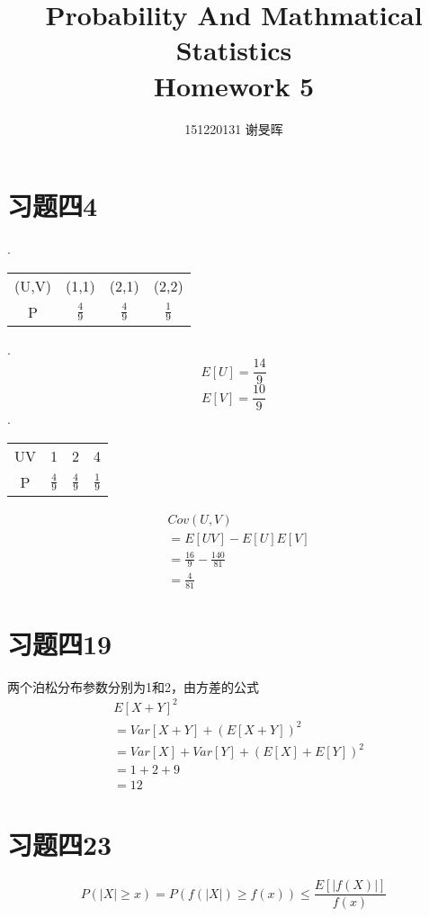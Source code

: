\documentclass[a4paper,twocolumn]{ctexart}
\title{Probability And Mathmatical Statistics\\Homework 5}
\author{151220131 谢旻晖}
\date{}
\begin{document}
\maketitle

\section*{习题四4}
.\\
\begin{center}
\begin{tabular}{cccc}
	\hline
	\hline
	(U,V)&(1,1)&(2,1)&(2,2)\\
	P&$\frac49$&$\frac49$&$\frac19$\\
	\hline
\end{tabular}
\end{center}
.\\
\[
E[U]=\frac{14}{9}
\]
\[
E[V]=\frac{10}{9}
\]
.\\
\begin{center}
	\begin{tabular}{cccc}
		\hline
		\hline
		UV&1&2&4\\
		P&$\frac{4}{9}$&$\frac{4}{9}$&$\frac{1}{9}$\\
		\hline
	\end{tabular}
\end{center}
\begin{align*}
&Cov(U,V)\\
&=E[UV]-E[U]E[V]\\
&=\frac{16}{9}-\frac{140}{81}\\
&=\frac{4}{81}
\end{align*}
\section*{习题四19}
两个泊松分布参数分别为1和2，由方差的公式
\begin{align*}
&E[X+Y]^2\\
&=Var[X+Y]+(E[X+Y])^2\\
&=Var[X]+Var[Y]+(E[X]+E[Y])^2\\
&=1+2+9\\
&=12
\end{align*}
\section*{习题四23}
\[
P(|X|\ge x)=P(f(|X|)\ge f(x))\le \frac{E[|f(X)|]}{f(x)}
\]
\end{document}
